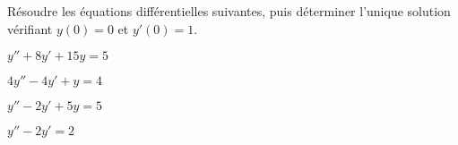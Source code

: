 \documentclass[a4paper, 11pt,reqno]{article}
\begin{document}
\begin{exercice}  \;
  R\'esoudre les \'equations diff\'erentielles suivantes, puis d\'eterminer l'unique solution v\'erifiant $y(0)=0$ et $y'(0)=1$.
  \begin{enumerate}
    \begin{minipage}[t]{0.45\textwidth}
      \item $y''+8y'+15y=5$
      \item $4y''-4y'+y=4$
    \end{minipage}
    \noindent \begin{minipage}[t]{0.45\textwidth}
      \item $y''-2y'+5y=5$
      \item $y''-2y'=2$
    \end{minipage}
  \end{enumerate}
\end{exercice}
\end{document}
